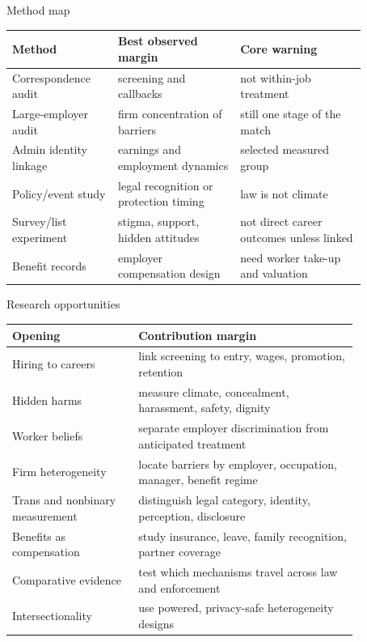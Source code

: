 \documentclass[aspectratio=169,11pt]{beamer}
\begin{document}
\begin{frame}{Method map}
\scriptsize
\begin{tabular}{p{0.26\linewidth} p{0.30\linewidth} p{0.31\linewidth}}
\toprule
Method & Best observed margin & Core warning \\
\midrule
Correspondence audit & screening and callbacks & not within-job treatment \\
Large-employer audit & firm concentration of barriers & still one stage of the match \\
Admin identity linkage & earnings and employment dynamics & selected measured group \\
Policy/event study & legal recognition or protection timing & law is not climate \\
Survey/list experiment & stigma, support, hidden attitudes & not direct career outcomes unless linked \\
Benefit records & employer compensation design & need worker take-up and valuation \\
\bottomrule
\end{tabular}
\end{frame}

\begin{frame}{Research opportunities}
\scriptsize
\begin{tabular}{p{0.31\linewidth} p{0.54\linewidth}}
\toprule
Opening & Contribution margin \\
\midrule
Hiring to careers & link screening to entry, wages, promotion, retention \\
Hidden harms & measure climate, concealment, harassment, safety, dignity \\
Worker beliefs & separate employer discrimination from anticipated treatment \\
Firm heterogeneity & locate barriers by employer, occupation, manager, benefit regime \\
Trans and nonbinary measurement & distinguish legal category, identity, perception, disclosure \\
Benefits as compensation & study insurance, leave, family recognition, partner coverage \\
Comparative evidence & test which mechanisms travel across law and enforcement \\
Intersectionality & use powered, privacy-safe heterogeneity designs \\
\bottomrule
\end{tabular}
\end{frame}
\end{document}
